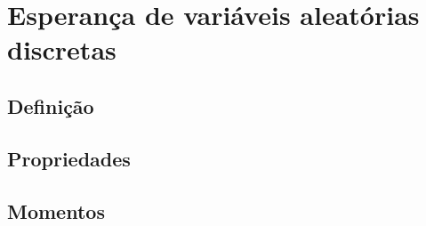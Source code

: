 \documentclass[../Notas.tex]{subfiles}
\begin{document}

\section{Esperança de variáveis aleatórias discretas}

\subsection{Definição}

\subsection{Propriedades}

\subsection{Momentos}
\end{document}
